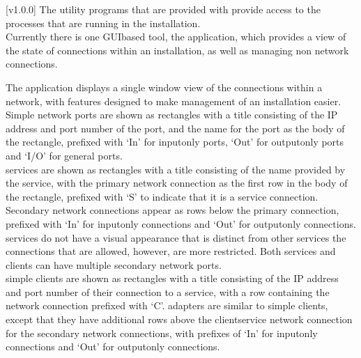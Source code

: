 [v1.0.0]
The utility programs that are provided with \mplusm{} provide access to the processes that
are running in the \mplusm{} installation.\\

Currently there is one GUI\longDash{}based tool, the \emph{\CMU} application, which
provides a view of the state of connections within an \mplusm{} installation, as well as
managing non\longDash\mplusm{} \yarp{} network connections.

The \emph{\CMU} application displays a single window view of the connections within a
\yarp{} network, with features designed to make management of an \mplusm{} installation
easier.
Simple \yarp{} network ports are shown as rectangles with a title consisting of the IP
address and port number of the port, and the \yarp{} name for the port as the body of the
rectangle, prefixed with `In' for input\longDash{}only ports, `Out' for
output\longDash{}only ports and `I/O' for general ports.\\

\mplusm{} services are shown as rectangles with a title consisting of the name provided by
the service, with the primary \yarp{} network connection as the first row in the body of
the rectangle, prefixed with `S' to indicate that it is a service connection.
Secondary \yarp{} network connections appear as rows below the primary connection,
prefixed with `In' for input\longDash{}only connections and `Out' for
output\longDash{}only connections.
\mplusm{}  services do not have a visual appearance that is distinct from
other \mplusm{} services \longDash{} the connections that are allowed, however, are more
restricted.
Both \mplusm{} services and clients can have multiple secondary \yarp{} network ports.\\

\mplusm{} simple clients are shown as rectangles with a title consisting of the IP address
and port number of their connection to a service, with a row containing the \yarp{}
network connection prefixed with `C'.
\mplusm{} adapters are similar to \mplusm{} simple clients, except that they have
additional rows above the client\longDash{}service \yarp{} network connection for the
secondary \yarp{} network connections, with prefixes of `In' for input\longDash{}only
connections and `Out' for output\longDash{}only connections.\\

